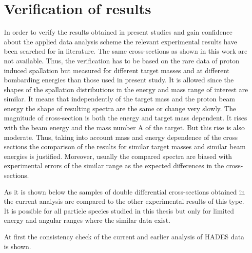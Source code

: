  



\section{\label{result_verification} Verification of results}

In order to verify the results obtained in present studies and gain  confidence about the applied data analysis scheme the relevant experimental results have been searched for in literature. The same cross-sections as shown in this work are not available. Thus, the verification has to be based on the rare data of proton induced spallation but measured for different target masses and at different bombarding energies than those used in present study.  
It is allowed since the shapes of the spallation distributions 
in the energy and mass range of interest are similar.
It means that independently of the target mass and the proton beam energy the shape of resulting spectra are the same or change very slowly. 
The magnitude of cross-section is both the energy and target mass dependent. It rises with the beam energy
and the mass number A of the target. 
But this rise is also moderate. Thus, taking into account mass and energy dependence of the cross sections the comparison of the results 
for similar target masses and similar beam energies is justified. 
Moreover, usually the compared spectra are biased with experimental errors of the similar range as the expected differences in the
cross-sections.

As it is shown below the samples of double differential cross-sections obtained in the current analysis are compared to the
other experimental results of this type. It is possible for all 
particle species studied in this thesis but only for limited 
energy and angular ranges where the similar data exist. 

At first the consistency check of the current and earlier analysis of HADES data is shown.


